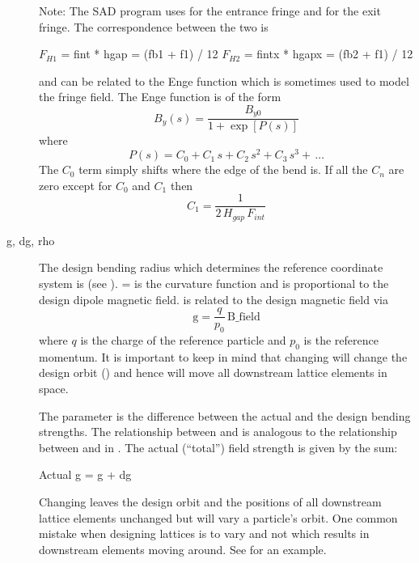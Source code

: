 \begin{description}
Note: The SAD program uses  for the entrance fringe and  for the exit
fringe. The correspondence between the two is
\begin{example2}
  \(F_{H1}\) = fint  * hgap  = (fb1 + f1) / 12
  \(F_{H2}\) = fintx * hgapx = (fb2 + f1) / 12
\end{example2}

 and  can be related to the Enge function which is sometimes used to model the
fringe field. The Enge function is of the form
\begin{equation}
  B_y(s) = \frac{B_{y0}}{1 + \exp[P(s)]}
\end{equation}
where
\begin{equation}
  P(s) = C_0 + C_1 \, s + C_2 \, s^2 + C_3 \, s^3 + \, \ldots
\end{equation}
The $C_0$ term simply shifts where the edge of the bend is. If all the $C_n$ are zero except for
$C_0$ and $C_1$ then
\begin{equation}
  C_1 = \frac{1}{2 \,H_{gap} \, F_{int}}
\end{equation}
  \item[g, dg, rho] \Newline
The design bending radius which determines the reference coordinate system is  (see
).  =  is the curvature function and is proportional to the design
dipole magnetic field.  is related to the design magnetic field  via
\begin{equation}
  \text{g} = \frac{q}{p_0} \, \text{B_field} 
  \label{gqpb}
\end{equation}
where $q$ is the charge of the reference particle and $p_0$ is the reference momentum. It is
important to keep in mind that changing  will change the design orbit () and
hence will move all downstream lattice elements in space.

The parameter  is the difference between the actual and the design bending strengths. The
relationship between  and  is analogous to the relationship between  and
 in . The actual (``total'') field strength is given by the sum:
\begin{example}
  Actual g = g + dg
\end{example}
Changing  leaves the design orbit and the positions of all downstream lattice elements
unchanged but will vary a particle's orbit. One common mistake when designing lattices is to vary
 and not  which results in downstream elements moving around. See 
for an example.


\end{description}
